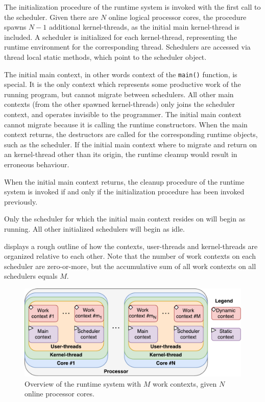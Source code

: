 The initialization procedure of the runtime system is invoked with the first call to the scheduler. Given there are $N$ online logical processor cores, the procedure spawns $N-1$ additional kernel\hyp{}threads, as the initial main kernel\hyp{}thread is included. A scheduler is initialized for each kernel\hyp{}thread, representing the runtime environment for the corresponding thread. Schedulers are accessed via thread local static methods, which point to the scheduler object.

The initial main context, in other words context of the \texttt{main()} function, is special. It is the only context which represents some productive work of the running program, but cannot migrate between schedulers. All other main contexts (from the other spawned kernel\hyp{}threads) only joins the scheduler context, and operates invisible to the programmer. The initial main context cannot migrate because it is calling the runtime constructors. When the main context returns, the destructors are called for the corresponding runtime objects, such as the scheduler. If the initial main context where to migrate and return on an kernel\hyp{}thread other than its origin, the runtime cleanup would result in erroneous behaviour.

When the initial main context returns, the cleanup procedure of the runtime system is invoked if and only if the initialization procedure has been invoked previously.

Only the scheduler for which the initial main context resides on will begin as running. All other initialized schedulers will begin as idle.

 displays a rough outline of how the contexts, user\hyp{}threads and kernel\hyp{}threads are organized relative to each other. Note that the number of work contexts on each scheduler are zero\hyp{}or\hyp{}more, but the accumulative sum of all work contexts on all schedulers equals $M$.

\begin{figure}[h!]
    \centering
    \includegraphics[width=0.9\linewidth]{fig/runtime_overview}
    \caption{Overview of the runtime system with $M$ work contexts, given $N$ online processor cores.}
    \label{fig:runtime_overview}
\end{figure}


